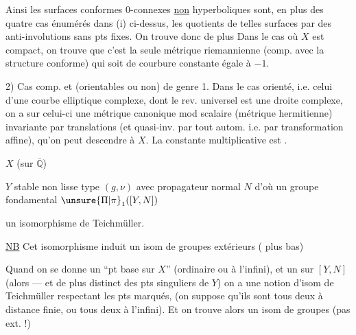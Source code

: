 
Ainsi les surfaces conformes  0-connexes \uline{non} hyperboliques sont, en plus des quatre cas énumérés dans (i) ci-dessus, les quotients de telles surfaces par des anti-involutions sans pts fixes. On trouve donc de plus
Dans le cas où $X$ est compact, on trouve que c'est la seule métrique riemannienne (comp. avec la structure conforme) qui soit de courbure constante égale à $-1$.

2) Cas  comp. et (orientables ou non) de genre 1. Dans le cas orienté, i.e. celui d'une courbe elliptique complexe, dont le rev. universel est une droite complexe, on a sur celui-ci une métrique canonique mod scalaire (métrique hermitienne) invariante par translations (et quasi-inv. par tout autom. i.e. par transformation affine), qu'on peut descendre à $X$. La constante multiplicative est
.

$X$   (sur $\overline{\mathbb Q}$)

$Y$ stable non lisse type $(g,\nu)$ avec propagateur normal $N$ d'où un groupe fondamental  $\unsure{\Pi|\pi}_1([Y,N])$

 un isomorphisme de Teichmüller.

\uline{NB} Cet isomorphisme induit un isom de groupes extérieurs  ( plus bas)

Quand on se donne un ``pt base sur $X$'' (ordinaire ou à l'infini), et un sur $[Y,N]$ (alors --- et de plus distinct des pts singuliers de $Y$) on a une notion d'isom de Teichmüller respectant les pts marqués,  (on suppose qu'ils sont tous deux à distance finie, ou tous deux à l'infini). Et on trouve alors un isom de groupes (pas ext. !)

